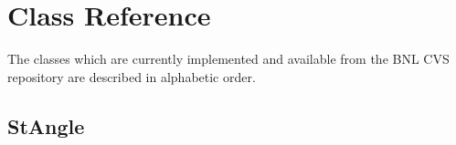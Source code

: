 \documentclass[twoside]{article}
\begin{document}
\clearpage


  
\section{Class Reference}
The classes which are currently implemented and available from the
BNL CVS repository are described in alphabetic order.
\clearpage

%
%
\subsection{StAngle}  \label{StAngle}
\end{document}
